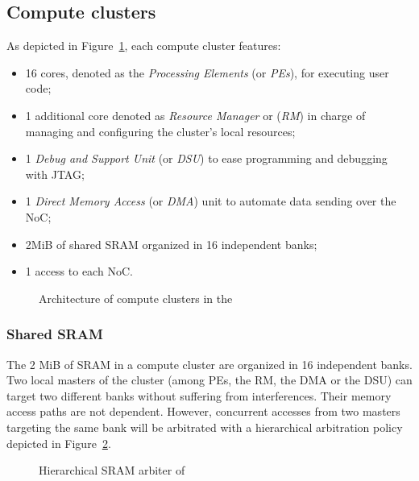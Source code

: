 \documentclass[main.tex]{subfiles}
\begin{document}
\subsection{Compute clusters}
As depicted in Figure~\ref{fig_execModel_MPPAComputeCluster}, each compute
cluster features:
\begin{itemize}
    \item 16 cores, denoted as the \emph{Processing Elements} (or \emph{PEs}),
        for executing user code;
    \item 1 additional core denoted as \emph{Resource Manager} or (\emph{RM})
        in charge of managing and configuring the cluster's local resources;
    \item 1 \emph{Debug and Support Unit} (or \emph{DSU}) to ease programming
        and debugging with JTAG;
    \item 1 \emph{Direct Memory Access} (or \emph{DMA}) unit to automate data
        sending over the NoC;
    \item 2MiB of shared SRAM organized in 16 independent banks;
    \item 1 access to each NoC.
\end{itemize}



\begin{figure}
    \centering
    \scalebox{0.8}{}
    \caption{Architecture of compute clusters in the \mppalong}
    \label{fig_execModel_MPPAComputeCluster}
\end{figure}


\subsubsection{Shared SRAM}
The 2 MiB of SRAM in a compute cluster are organized in 16 independent banks.
Two local masters of the cluster (among PEs, the RM, the DMA or the DSU) can
target two different banks without suffering from interferences. Their memory
access paths are not dependent. However, concurrent accesses from two masters
targeting the same bank will be arbitrated with a hierarchical arbitration
policy depicted in Figure~\ref{fig_execModel_MPPASMEMarbiter}.
\begin{figure}
    \centering
    \scalebox{0.8}{}
    \caption{Hierarchical SRAM arbiter of \mppalong}
    \label{fig_execModel_MPPASMEMarbiter}
\end{figure}
\end{document}
